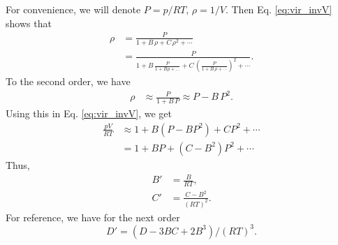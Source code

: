 \documentclass[twocolumn, 10pt]{article}
\numberwithin{equation}{section}
\newenvironment{solution}[1][\empty]
{\par\medskip
  \textbf{\ifx\empty#1{Solution.}\relax\else{#1}\fi} \ignorespaces}
{\medskip}
\begin{document}
\begin{solution}
  For convenience, we will denote $P = p/RT$, $\rho = 1/V$.
  Then Eq. \eqref{eq:vir_invV} shows that
  \begin{align*}
    \rho
    &=
    \frac{ P } { 1 + B \, \rho + C \, \rho^2 + \cdots}
    \\
    &=
    \frac{ P } { 1 + B \, \frac{ P } { 1 + B \rho + \dots}
    + C \, \left( \frac{P}{1+B\,\rho+\cdots} \right)^2 + \cdots}
    .
  \end{align*}
  To the second order, we have
  \begin{align*}
    \rho
    &\approx
    \frac{ P } { 1 + B \, P}
    \approx
    P - B \, P^2
    .
  \end{align*}
  Using this in Eq. \eqref{eq:vir_invV}, we get
  \begin{align*}
  \frac{pV}{RT}
  &\approx
  1 + B (P - B P^2) + C P^2 + \cdots
  \\
  &=
  1 + B P + (C-B^2) P^2 + \cdots
  \end{align*}
  Thus,
  \begin{align*}
    B' &= \frac{B}{RT}, \\
    C' &= \frac{C - B^2}{(RT)^2}.
  \end{align*}
  For reference, we have for the next order
  $$
  D' = (D -3BC+2B^3)/(RT)^3.
  $$
\end{solution}
\end{document}
